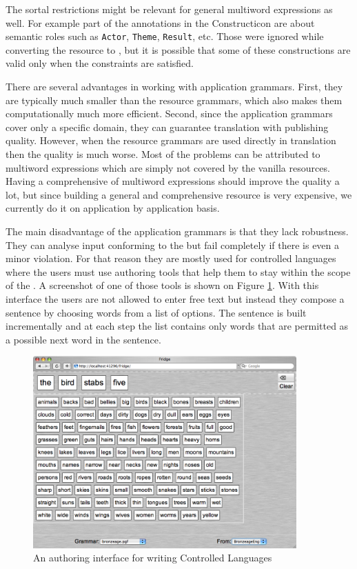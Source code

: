 \documentclass[output=paper]{langsci/langscibook}
\begin{document}
The sortal restrictions might be relevant for general
multiword expressions as well. For example part of the
annotations in the  Constructicon are about semantic roles
such as \texttt{Actor}, \texttt{Theme}, \texttt{Result}, etc.
Those were ignored while converting the resource to , but
it is possible that some of these constructions are valid only when
the constraints are satisfied.

There are several advantages in working with application grammars.
First, they are typically much smaller than the resource grammars, which
also makes them computationally much more efficient. Second, since
the application grammars cover only a specific domain, they can
guarantee translation with publishing quality. However, when the resource
grammars are used directly in translation then the quality is much worse.
Most of the problems can be attributed to multiword expressions
which are simply not covered by the vanilla resources. 
Having a comprehensive  of multiword expressions should
improve the quality a lot, but since building 
a general and comprehensive resource is very expensive, we currently
do it on application by application basis.

The main disadvantage of the application grammars is that they lack
robustness. They can analyse input conforming to the  but
fail completely if there is even a minor violation. For that reason
they are mostly used for controlled languages 
\citep{angelov:2009:icl} where the users must use 
authoring tools that help them to stay within the scope of the .
A screenshot of one of those tools \citep{ranta2010tools}
is shown on Figure \ref{ang:fig:fridge}. With this interface the users
are not allowed to enter free text but instead they compose a sentence
by choosing words from a list of options. The sentence is built
incrementally and at each step the list contains only words
that are permitted as a possible next word in the sentence.

\begin{figure}
\center
\includegraphics[width=0.9\textwidth]{figures/fridge-poetry-screenshot}
\caption{An authoring interface for writing Controlled Languages}
\label{ang:fig:fridge}
\end{figure}
\end{document}
